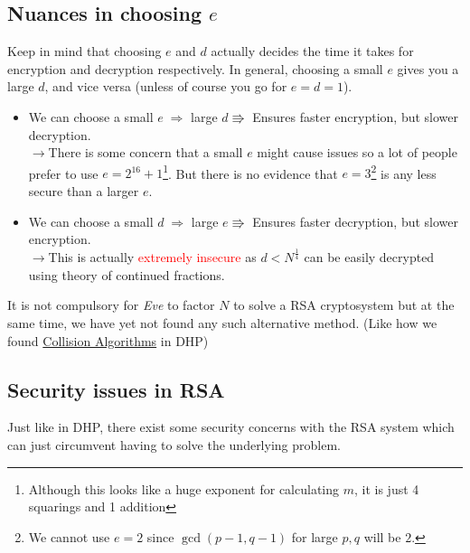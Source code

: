 		\subsection{Nuances in choosing \(e\)}\label{subsec:nuances}
			Keep in mind that choosing \(e\) and \(d\) actually decides the time it takes for encryption and decryption respectively. In general, choosing a small \(e\) gives you a large \(d\), and vice versa (unless of course you go for \(e=d=1\)).
			\begin{itemize}
				\item We can choose a small \(e\;\Rightarrow\) large $d\Rrightarrow$ Ensures faster encryption, but slower decryption.\\
				\(\rightarrow\)There is some concern that a small $e$ might cause issues so a lot of people prefer to use $e=2^{16}+1$\footnote{Although this looks like a huge exponent for calculating $m$, it is just 4 squarings and 1 addition}. But there is no evidence that \(e=3\)\footnote{We cannot use $e=2$ since \(\gcd(p-1,q-1)\) for large $p,q$ will be $2$.} is any less secure than a larger $e$.
				\item We can choose a small \(d\; \Rightarrow\) large \(e\Rrightarrow\) Ensures faster decryption, but slower encryption.\\
				\(\rightarrow\)This is actually \textcolor{red}{extremely insecure} as \(d<N^\frac14\) can be easily decrypted using theory of continued fractions.
			\end{itemize}

			It is not compulsory for \emph{Eve} to factor \(N\) to solve a RSA cryptosystem but at the same time, we have yet not found any such alternative method. (Like how we found \hyperref[sec:colli]{Collision Algorithms} in DHP)

		\subsection{Security issues in RSA}	
			Just like in DHP, there exist some security concerns with the RSA system which can just circumvent having to solve the underlying problem. 

